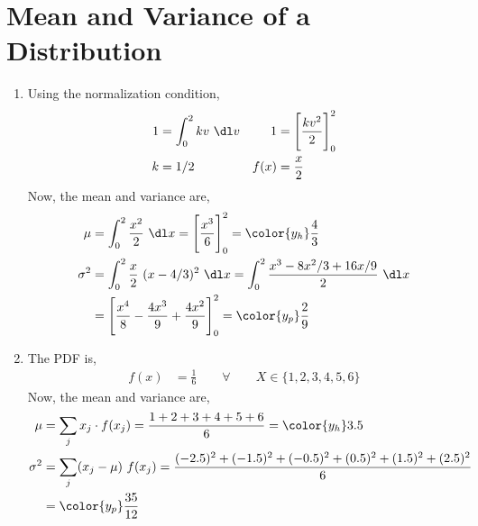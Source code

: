 \section{Mean and Variance of a Distribution}

\begin{enumerate}
    \item Using the normalization condition,
          \begin{align}
              1    & = \int_{0}^{2} kv\ \dl v           &
              1    & = \Bigg[ \frac{kv^2}{2} \Bigg]_0^2   \\
              k    & = 1/2                              &
              f(x) & = \frac{x}{2}
          \end{align}
          Now, the mean and variance are,
          \begin{align}
              \mu      & = \int_{0}^{2} \frac{x^2}{2}\ \dl x = \Bigg[\frac{x^3}{6}
              \Bigg]_0^2 = \color{y_h} \frac{4}{3}                                 \\
              \sigma^2 & = \int_{0}^{2} \frac{x}{2}\ (x-4/3)^2\ \dl x
              = \int_{0}^{2} \frac{x^3 - 8x^2/3 + 16x/9}{2}\ \dl x                 \\
                       & = \Bigg[ \frac{x^4}{8} - \frac{4x^3}{9} + \frac{4x^2}{9}
                  \Bigg]_0^2 = \color{y_p} \frac{2}{9}
          \end{align}

    \item The PDF is,
          \begin{align}
              f(x) & = \frac{1}{6} \qquad \forall \qquad X \in \{1,2,3,4,5,6\}
          \end{align}
          Now, the mean and variance are,
          \begin{align}
              \mu      & = \sum_j x_j \cdot f(x_j) = \frac{1+2+3+4+5+6}{6}
              = \color{y_h} 3.5                                                      \\
              \sigma^2 & = \sum_j (x_j - \mu)\ f(x_j) =
              \frac{(-2.5)^2 + (-1.5)^2 + (-0.5)^2 + (0.5)^2 + (1.5)^2 + (2.5)^2}{6} \\
                       & = \color{y_p} \frac{35}{12}
          \end{align}


\end{enumerate}
